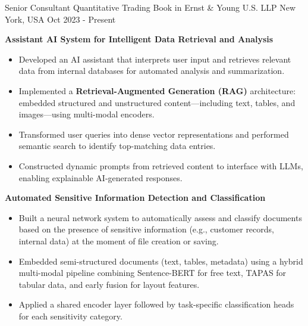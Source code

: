 

\begin{cventries}

  \cventry
    {Senior Consultant} %
    {Quantitative Trading Book in Ernst \& Young U.S. LLP} %
    {New York, USA} %
    {Oct 2023 - Present} %
    {
      \begin{cvitems}
        \item \textbf{Assistant AI System for Intelligent Data Retrieval and Analysis}
        \begin{itemize}
          \item Developed an AI assistant that interprets user input and retrieves relevant data from internal databases for automated analysis and summarization.
          \item Implemented a \textbf{Retrieval-Augmented Generation (RAG)} architecture: embedded structured and unstructured content—including text, tables, and images—using multi-modal encoders.
          \item Transformed user queries into dense vector representations and performed semantic search to identify top-matching data entries.
          \item Constructed dynamic prompts from retrieved content to interface with LLMs, enabling explainable AI-generated responses.
        \end{itemize}
        \item \textbf{Automated Sensitive Information Detection and Classification}
        \begin{itemize}
          \item Built a neural network system to automatically assess and classify documents based on the presence of sensitive information (e.g., customer records, internal data) at the moment of file creation or saving.
          \item Embedded semi-structured documents (text, tables, metadata) using a hybrid multi-modal pipeline combining Sentence-BERT for free text, TAPAS for tabular data, and early fusion for layout features.
          \item Applied a shared encoder layer followed by task-specific classification heads for each sensitivity category.

\end{itemize}
\end{cvitems}}
\end{cventries}
